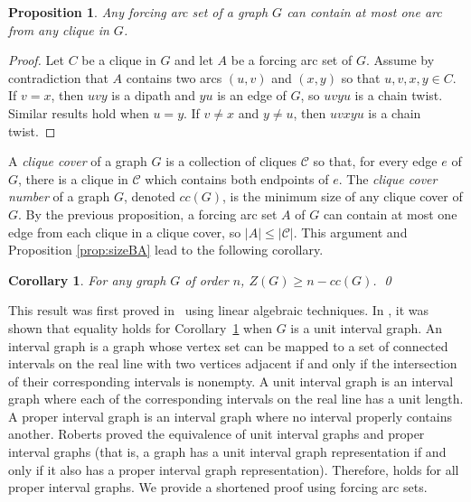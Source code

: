\documentclass[12pt]{amsart}
\theoremstyle{plain}
\newtheorem{proposition}[theorem]{Proposition}
\newtheorem{corollary}[theorem]{Corollary}
\theoremstyle{definition}
\def\C{\mathcal C}
\begin{document}
\begin{proposition}
    Any forcing arc set of a graph $G$ can contain at most one arc from any clique in $G$. 
\end{proposition}
\begin{proof}
Let $C$ be a clique in $G$ and let $A$ be a forcing arc set of $G$.
Assume by contradiction that $A$ contains two arcs $(u,v)$ and $(x,y)$ so that $u,v,x,y\in C$. If $v=x$, then $uvy$ is a dipath and $yu$ is an edge of $G$, so $uvyu$ is a chain twist. Similar results hold when $u=y$. If $v\not=x$ and $y\not=u$, then $uvxyu$ is a chain twist.
\end{proof}

A \emph{clique cover} of a graph $G$ is a collection of cliques $\C$ so that, for every edge $e$ of $G$, there is a clique in $\C$ which contains both endpoints of $e$. The \emph{clique cover number} of a graph $G$, denoted $cc(G)$, is the minimum size of any clique cover of $G$. By the previous proposition, a forcing arc set $A$ of $G$ can contain at most one edge from each clique in a clique cover, so $|A|\leq|\C|$. This argument and Proposition \ref{prop:sizeBA} lead to the following corollary.

\begin{corollary}\label{corollary: zf cc}
    For any graph $G$ of order $n$, $Z(G)\geq n-cc(G)$. \hfill \qed
\end{corollary}


This result was first proved in~\cite{FALLAT2007558} using linear algebraic techniques. 
In \cite[Theorem~9]{Huang2010}, it was shown that equality holds for Corollary~\ref{corollary: zf cc} when $G$ is a unit interval graph. An interval graph is a graph whose vertex set can be mapped to a set of connected intervals on the real line with two vertices adjacent if and only if the intersection of their corresponding intervals is nonempty. A unit interval graph is an interval graph where each of the corresponding intervals on the real line has a unit length. A proper interval graph is an interval graph where no interval properly contains another.
Roberts \cite{roberts1969indifference} proved the equivalence of unit interval graphs and proper interval graphs (that is, a graph has a unit interval graph representation if and only if it also has a proper interval graph representation).
Therefore, \cite[Theorem~9]{Huang2010} holds for all proper interval graphs.
We provide a shortened proof using forcing arc sets. 
\end{document}

